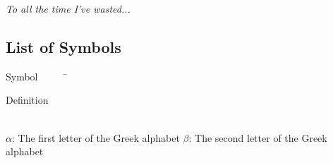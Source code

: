 \documentclass{ucalgarythesis}
\theoremstyle{plain}
\theoremstyle{definition}
\begin{document}
  \begin{dedication}
     \emph{To all the time I've wasted...}
  \end{dedication}

  \begin{singlespace}   %

  \cleardoublepage{}
  \tableofcontents

  \cleardoublepage{}
  \listoffigures
  
  \cleardoublepage{}
  \listoftables
  
  \chapter{List of Symbols}      
  \begin{tabbing}
    Symbol~~~~~\= \ \ \ \ \ \ \ \ \ \ \ \ \ \ \ \ \ \ \ \ \ \ \ \ \ \ \ \ \ \ \ \ \ \ \ \  \parbox{5in}{Definition}\\

    \addsymbol \mbox{$\alpha$}: {The first letter of the Greek alphabet}
    \addsymbol \mbox{$\beta$}: {The second letter of the Greek alphabet}
  \end{tabbing}
  
  \end{singlespace}     %
  
%
\end{document}
